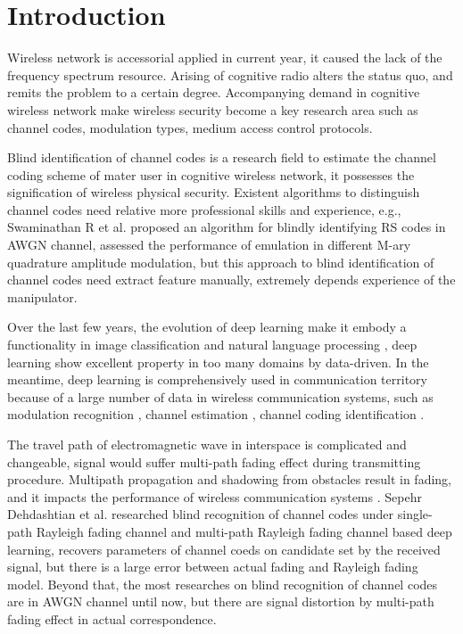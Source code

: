 \documentclass[conference]{IEEEtran}
\begin{document}
\section{Introduction}



Wireless network is accessorial applied in current year, it caused the lack of the frequency spectrum resource. Arising of cognitive radio alters the status quo, and remits the problem to a certain degree. Accompanying demand in cognitive wireless network \cite{2021Analysis} make wireless security become a key research area such as channel codes, modulation types, medium access control protocols.

Blind identification of channel codes \cite{xia2013novel} is a research field to estimate the channel coding scheme of mater user in cognitive wireless network, it possesses the signification of wireless physical security. Existent algorithms to distinguish channel codes need relative more professional skills and experience, e.g., Swaminathan R et al. \cite{swaminathan2017parameter} proposed an algorithm for blindly identifying RS codes in AWGN channel, assessed the performance of  emulation in different M-ary quadrature amplitude modulation, but this approach to blind identification of channel codes need extract feature manually, extremely depends experience of the manipulator.

Over the last few years, the evolution of deep learning make it embody a functionality in image classification \cite{pei2019effects} and natural language processing \cite{hao2021health}, deep learning show excellent property in too many domains by data-driven. In the meantime, deep learning is comprehensively used in communication territory because of a large number of data in wireless communication systems, such as modulation recognition \cite{jiang2021automatic}, channel estimation \cite{ebrahiem2021deep}, channel coding identification \cite{tian2020deep}. 

The travel path of electromagnetic wave in interspace is complicated and changeable, signal would suffer multi-path fading effect during transmitting procedure. Multipath propagation and
shadowing from obstacles result in fading, and it impacts the performance of wireless communication systems \cite{priyanka2018k}. Sepehr Dehdashtian et al. \cite{dehdashtian2021deep} researched blind recognition of channel codes under single-path Rayleigh fading channel and multi-path Rayleigh fading channel based deep learning, recovers parameters of channel coeds on candidate set by the received signal, but there is a large error between actual fading and Rayleigh fading model. Beyond that, the most researches on blind recognition of channel codes are in AWGN channel until now, but there are signal distortion by multi-path fading effect in actual correspondence. 
\end{document}
